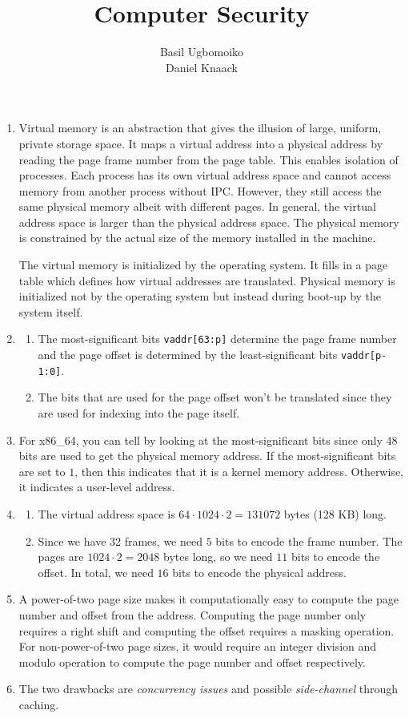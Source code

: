 \documentclass[sheet=1, english]{dexercise}
\title{Computer Security}
\author{Basil Ugbomoiko\\Daniel Knaack}
\begin{document}

\begin{enumerate}
  \item
    Virtual memory is an abstraction that gives the illusion of large, uniform, private storage space.
    It maps a virtual address into a physical address by reading the page frame number from the page table.
    This enables isolation of processes.
    Each process has its own virtual address space and cannot access memory from another process without IPC.
    However, they still access the same physical memory albeit with different pages.
    In general, the virtual address space is larger than the physical address space.
    The physical memory is constrained by the actual size of the memory installed in the machine.


    The virtual memory is initialized by the operating system.
    It fills in a page table which defines how virtual addresses are translated.
    Physical memory is initialized not by the operating system but instead during boot-up by the system itself.
  \item
    \begin{enumerate}
      \item
        The most-significant bits \texttt{vaddr[63:p]} determine the page frame
        number and the page offset is determined by the least-significant bits
        \texttt{vaddr[p-1:0]}.
      \item
        The bits that are used for the page offset won't be translated since
        they are used for indexing into the page itself.
    \end{enumerate}
  \item
    For x86\_64, you can tell by looking at the most-significant bits since only
    48 bits are used to get the physical memory address. If the most-significant
    bits are set to $1$, then this indicates that it is a kernel memory address.
    Otherwise, it indicates a user-level address.
  \item
    \begin{enumerate}
      \item
        The virtual address space is $64 \cdot 1024 \cdot 2 = 131072$ bytes (128 KB) long.
      \item
        Since we have 32 frames, we need $5$ bits to encode the frame number.
        The pages are $1024 \cdot 2 = 2048$ bytes long, so we need $11$ bits to encode the offset.
        In total, we need $16$ bits to encode the physical address.
    \end{enumerate}
  \item
    A power-of-two page size makes it computationally easy to compute the page
    number and offset from the address. Computing the page number only requires
    a right shift and computing the offset requires a masking operation. For
    non-power-of-two page sizes, it would require an integer division and modulo
    operation to compute the page number and offset respectively.
  \item
    The two drawbacks are \emph{concurrency issues} and possible
    \emph{side-channel} through caching.


\end{enumerate}
\end{document}
